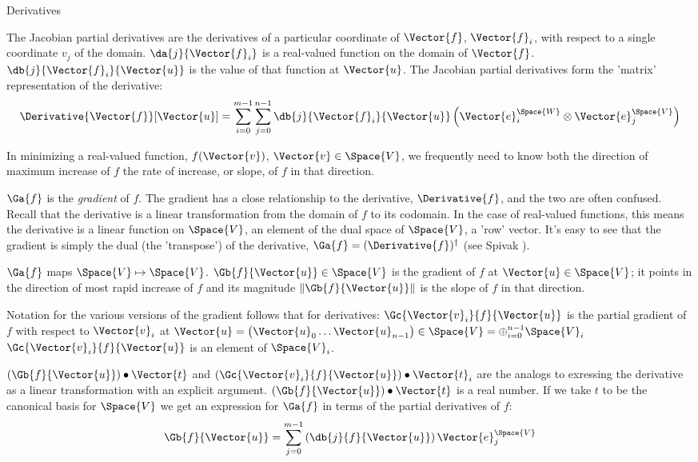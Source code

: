 \begin{plSection}{Derivatives}
\begin{itemize}
The Jacobian partial derivatives are the derivatives of
a particular coordinate of $\Vector{f}$, $\Vector{f}_i$, with respect to
a single coordinate $v_j$ of the domain.
$\da{j}{\Vector{f}_i}$ is a real-valued function on the domain of $\Vector{f}$.
$\db{j}{\Vector{f}_i}{\Vector{u}}$ is the value of that function at $\Vector{u}$.
The Jacobian partial derivatives form the 'matrix' representation of the derivative:
\begin{equation}
\Derivative{\Vector{f}}[\Vector{u}] =
\sum_{i=0}^{m-1}
\sum_{j=0}^{n-1}
\db{j}{\Vector{f}_i}{\Vector{u}}
\left( 
\Vector{e}_i^{\Space{W}} \otimes \Vector{e}_j^{\Space{V}} 
\right)
\end{equation}

\end{itemize}

In minimizing a real-valued function, $f(\Vector{v})$, $\Vector{v} \in \Space{V}$,
we frequently need to know both the direction of maximum increase of $f$
the rate of increase, or slope, of $f$ in that direction.

$\Ga{f}$ is the \textit{gradient} of $f$.
The gradient has a close relationship to the derivative, $\Derivative{f}$,
and the two are often confused.
Recall that the derivative is a linear transformation
from the domain of $f$ to its codomain.
In the case of real-valued functions,
this means the derivative is a linear function on $\Space{V}$,
an element of the dual space of $\Space{V}$, a 'row' vector.
It's easy to see that the gradient is simply the dual (the 'transpose')
of the derivative, $\Ga{f} = (\Derivative{f})^{\dagger}$
(see Spivak \cite[p.~96, ex.~4-18]{Spivak:1965:CalculusOnManifolds}).

$\Ga{f}$ maps $\Space{V} \mapsto \Space{V}$.
$\Gb{f}{\Vector{u}} \in \Space{V}$ is the gradient of $f$ at $\Vector{u} \in \Space{V}$;
it points in the direction of most rapid increase of
$f$ and its magnitude $\| \Gb{f}{\Vector{u}} \|$ is the
slope of $f$ in that direction.

Notation for the various versions of the gradient
follows that for derivatives:
$\Gc{\Vector{v}_i}{f}{\Vector{u}}$ is the partial gradient of $f$ with respect to $\Vector{v}_i$ at
$\Vector{u} = \left( \Vector{u}_0 \ldots \Vector{u}_{n-1} \right) \in \Space{V} = \oplus_{i=0}^{n-1} \Space{V}_i$
$\Gc{\Vector{v}_i}{f}{\Vector{u}}$ is an element of $\Space{V}_i$.

$(\Gb{f}{\Vector{u}}) \bullet  \Vector{t}$
and
$(\Gc{\Vector{v}_i}{f}{\Vector{u}}) \bullet \Vector{t}_i$
are the analogs to exressing the derivative as a linear transformation
with an explicit argument.
$(\Gb{f}{\Vector{u}}) \bullet  \Vector{t}$ is a real number.
If we take $t$ to be the canonical basis for $\Space{V}$
we get an expression for $\Ga{f}$ in terms of the partial derivatives of $f$:
\begin{equation}
\label{eq:gradient-from-partials}
\Gb{f}{\Vector{u}} = \sum_{j=0}^{m-1} \left( \db{j}{f}{\Vector{u}} \right) \Vector{e}_j^{\Space{V}}
\end{equation}


\end{plSection}
